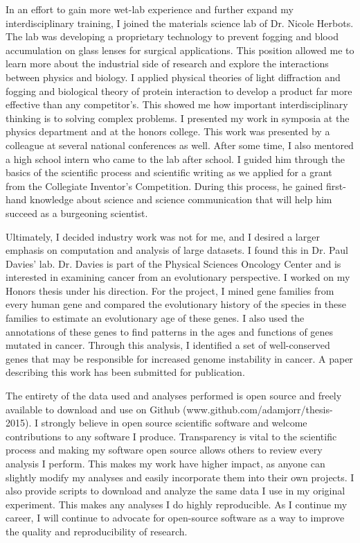 \documentclass[12pt]{article}
\begin{document}
In an effort to gain more wet-lab experience and further expand my interdisciplinary training, I joined the materials science lab of Dr. Nicole Herbots. The lab was developing a proprietary technology to prevent fogging and blood accumulation on glass lenses for surgical applications. This position allowed me to learn more about the industrial side of research and explore the interactions between physics and biology. I applied physical theories of light diffraction and fogging and biological theory of protein interaction to develop a product far more effective than any competitor's. This showed me how important interdisciplinary thinking is to solving complex problems. I presented my work in symposia at the physics department and at the honors college. This work was presented by a colleague at several national conferences as well. After some time, I also mentored a high school intern who came to the lab after school. I guided him through the basics of the scientific process and scientific writing as we applied for a grant from the Collegiate Inventor's Competition. During this process, he gained first-hand knowledge about science and science communication that will help him succeed as a burgeoning scientist.

Ultimately, I decided industry work was not for me, and I desired a larger emphasis on computation and analysis of large datasets. I found this in Dr. Paul Davies' lab. Dr. Davies
is part of the Physical Sciences Oncology Center
and is interested in examining cancer from an evolutionary perspective.
I worked on my Honors thesis under his direction. For the project, I mined gene families from every human gene and compared the evolutionary history of the species in these families to estimate an evolutionary age of these genes. I also used the annotations of these genes to find patterns in the ages and functions of genes mutated in cancer. Through this analysis, I identified a set of well-conserved genes that may be responsible for increased genome instability in cancer. A paper describing this work has been submitted for publication.

The entirety of the data used and analyses performed is open source and freely available to download and use on Github (www.github.com/adamjorr/thesis-2015). I strongly believe in open source scientific software and welcome contributions to any software I produce. Transparency is vital to the scientific process and making my software open source allows others to review every analysis I perform. This makes my work have higher impact, as anyone can slightly modify my analyses and easily incorporate them into their own projects. I also provide scripts to download and analyze the same data I use in my original experiment. This makes any analyses I do highly reproducible. As I continue my career, I will continue to advocate for open-source software as a way to improve the quality and reproducibility of research.
\end{document}
